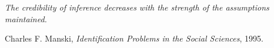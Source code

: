 %
%

\newcommand{\fondateurnexialog}{Ali~BEHBAHANI}

%
%
%
\thispagestyle{empty}
\vspace*{0.30\textheight}

\begin{flushright}
\begin{minipage}{0.72\textwidth}
\itshape{} 
The credibility of inference decreases with the strength of the assumptions
maintained.

\vspace{10pt}
\normalfont\small\raggedleft
Charles F. Manski, \emph{Identification Problems in the Social Sciences}, 1995.
\end{minipage}
\end{flushright}

